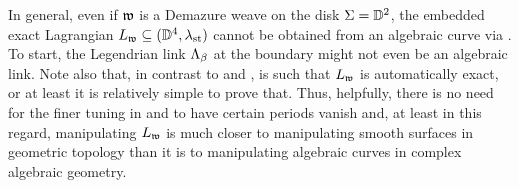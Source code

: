 \begin{remark}
In general, even if $\mathfrak{w}$ is a Demazure weave on the disk $\Sigma=\mathbb{D}^2$, the embedded exact Lagrangian $L_{\mathfrak{w}}\subseteq(\mathbb{D}^4,\lambda_{\text{st}})$ cannot be obtained from an algebraic curve via . To start, the Legendrian link $\Lambda_\beta$ at the boundary might not even be an algebraic link. Note also that, in contrast to  and ,  is such that $L_{\mathfrak{w}}$ is automatically exact, or at least it is relatively simple to prove that. Thus, helpfully, there is no need for the finer tuning in  and  to have certain periods vanish and, at least in this regard, manipulating $L_{\mathfrak{w}}$ is much closer to manipulating smooth surfaces in geometric topology than it is to manipulating algebraic curves in complex algebraic geometry.\sbs
\end{remark}

